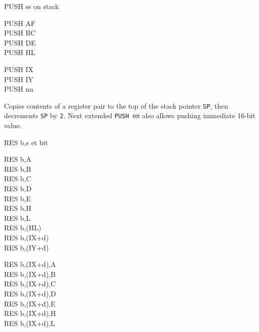 \begin{basedescript}{
	\desclabelstyle{\multilinelabel}
	\desclabelwidth{3cm}}
	\pagebreak
	\begin{DetailItem}{PUSH ss}
		{ on stack}
		{}

		\begin{DetailVariants}
			PUSH AF\\
			PUSH BC\\
			PUSH DE\\
			PUSH HL

			\columnbreak
			PUSH IX\\
			PUSH IY\\

			\columnbreak
			PUSH nn\ZXN
		\end{DetailVariants}

		Copies contents of a register pair to the top of the stack pointer {\tt SP}, then decrements {\tt SP} by {\tt 2}. Next extended {\tt PUSH nn} also allows pushing immediate 16-bit value.

		\begin{DetailEffects}
			\FlagsPUSHrr
		\end{DetailEffects}
				
		\begin{DetailTiming}
			\DetailTime[rr]{3}{11}
			\DetailTime[IX]{4}{15}
			\DetailTime[IY]{4}{15}
			\DetailTime[nn]{6}{23}
		\end{DetailTiming}

	\end{DetailItem}

	\begin{DetailItem}{RES b,s}
		{et bit}
		{\SymRES{s}}

		\begin{DetailVariants}
			RES b,A\\
			RES b,B\\
			RES b,C\\
			RES b,D\\
			RES b,E\\
			RES b,H\\
			RES b,L\\
			RES b,(HL)\\
			RES b,(IX+d)\\
			RES b,(IY+d)

			\columnbreak
			RES b,(IX+d),A\UNDOC\\
			RES b,(IX+d),B\UNDOC\\
			RES b,(IX+d),C\UNDOC\\
			RES b,(IX+d),D\UNDOC\\
			RES b,(IX+d),E\UNDOC\\
			RES b,(IX+d),H\UNDOC\\
			RES b,(IX+d),L\UNDOC


\end{DetailVariants}
\end{DetailItem}
\end{basedescript}
